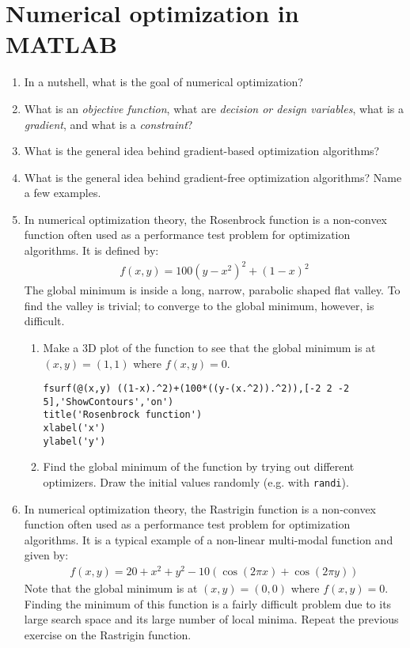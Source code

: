 \section[Numerical optimization in MATLAB]{Numerical optimization in MATLAB\label{ex:MatlabNumericalOptimization}}
\begin{enumerate}
\item In a nutshell, what is the goal of numerical optimization?
\item What is an \emph{objective function}, what are \emph{decision or design variables}, what is a \emph{gradient}, and what is a \emph{constraint}?
\item What is the general idea behind gradient-based optimization algorithms?
\item What is the general idea behind gradient-free optimization algorithms? Name a few examples.
\item In numerical optimization theory, the Rosenbrock function is a non-convex function often used as a performance test problem for optimization algorithms.
It is defined by:
\begin{align*}
f(x,y) = 100(y-x^2)^2 + (1-x)^2
\end{align*}
The global minimum is inside a long, narrow, parabolic shaped flat valley.
To find the valley is trivial;
  to converge to the global minimum, however, is difficult.

\begin{enumerate}

\item Make a 3D plot of the function to see that the global minimum is at $(x, y)=(1, 1)$ where $f(x, y)=0$.
\begin{lstlisting}[style=Matlab-editor,basicstyle=\mlttfamily\scriptsize]
fsurf(@(x,y) ((1-x).^2)+(100*((y-(x.^2)).^2)),[-2 2 -2 5],'ShowContours','on')
title('Rosenbrock function')
xlabel('x')
ylabel('y')
\end{lstlisting}

\item Find the global minimum of the function by trying out different optimizers.
Draw the initial values randomly (e.g. with \texttt{randi}).

\end{enumerate}  
\item In numerical optimization theory, the Rastrigin function is a non-convex function often used as a performance test problem for optimization algorithms.
It is a typical example of a non-linear multi-modal function and given by:
\begin{align*}
f(x,y) = 20 + x^2 + y^2 - 10(\cos(2\pi x)+\cos(2\pi y))
\end{align*}
Note that the global minimum is at $(x, y)=(0, 0)$ where $f(x, y)=0$.
Finding the minimum of this function is a fairly difficult problem due to its large search space and its large number of local minima.
Repeat the previous exercise on the Rastrigin function.
\end{enumerate}


